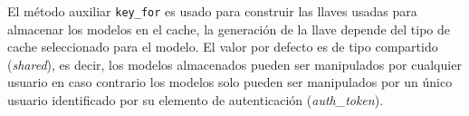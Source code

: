 El método auxiliar \texttt{key\_for} es usado para construir las llaves usadas para
almacenar los modelos en el cache, la generación de la llave depende del tipo de
cache seleccionado para el modelo.
El valor por defecto es de tipo compartido (\textit{shared}), es decir, los
modelos almacenados pueden ser manipulados por cualquier usuario en caso contrario
los modelos solo pueden ser manipulados por un único usuario identificado por su
elemento de autenticación (\textit{auth\_token}).


